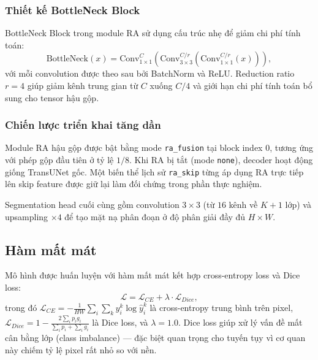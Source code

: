 \documentclass[10pt,a4paper]{article}
\begin{document}
\subsubsection{Thiết kế BottleNeck Block}

BottleNeck Block trong module RA sử dụng cấu trúc nhẹ để giảm chi phí tính toán:
\begin{equation}
    \text{BottleNeck}(x) = \text{Conv}_{1\times1}^{C}\left(\text{Conv}_{3\times3}^{C/r}\left(\text{Conv}_{1\times1}^{C/r}(x)\right)\right),
\end{equation}
với mỗi convolution được theo sau bởi BatchNorm và ReLU. Reduction ratio $r=4$ giúp giảm kênh trung gian từ $C$ xuống $C/4$ và giới hạn chi phí tính toán bổ sung cho tensor hậu gộp.

\subsubsection{Chiến lược triển khai tăng dần}

Module RA hậu gộp được bật bằng mode \texttt{ra\_fusion} tại block index 0, tương ứng với phép gộp đầu tiên ở tỷ lệ $1/8$. Khi RA bị tắt (mode \texttt{none}), decoder hoạt động giống TransUNet gốc. Một biến thể lịch sử \texttt{ra\_skip} từng áp dụng RA trực tiếp lên skip feature được giữ lại làm đối chứng trong phần thực nghiệm.

Segmentation head cuối cùng gồm convolution $3\times3$ (từ $16$ kênh về $K+1$ lớp) và upsampling $\times 4$ để tạo mặt nạ phân đoạn ở độ phân giải đầy đủ $H \times W$.

\subsection{Hàm mất mát}

Mô hình được huấn luyện với hàm mất mát kết hợp cross-entropy loss và Dice loss:
\begin{equation}
    \mathcal{L} = \mathcal{L}_{CE} + \lambda \cdot \mathcal{L}_{Dice},
\end{equation}
trong đó $\mathcal{L}_{CE} = -\frac{1}{HW}\sum_{i}\sum_{k} y_i^k \log \hat{y}_i^k$ là cross-entropy trung bình trên pixel, $\mathcal{L}_{Dice} = 1 - \frac{2\sum_i p_i g_i}{\sum_i p_i + \sum_i g_i}$ là Dice loss, và $\lambda = 1.0$. Dice loss giúp xử lý vấn đề mất cân bằng lớp (class imbalance) --- đặc biệt quan trọng cho tuyến tụy vì cơ quan này chiếm tỷ lệ pixel rất nhỏ so với nền.
\end{document}
